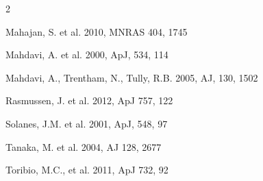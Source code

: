 \documentclass[11pt]{article}
\begin{document}
\begin{multicols}{2}



\noindent Mahajan, S. et al.  2010, MNRAS 404, 1745

\noindent Mahdavi, A. et al. 2000, ApJ, 534, 114

\noindent Mahdavi, A., Trentham, N., Tully, R.B. 2005, AJ, 130, 1502




\noindent Rasmussen, J. et al. 2012, ApJ 757, 122



\noindent Solanes, J.M. et al. 2001, ApJ, 548, 97

\noindent Tanaka, M. et al. 2004, AJ 128, 2677

\noindent Toribio, M.C., et al.  2011, ApJ 732, 92\\




\end{multicols}
\end{document}
